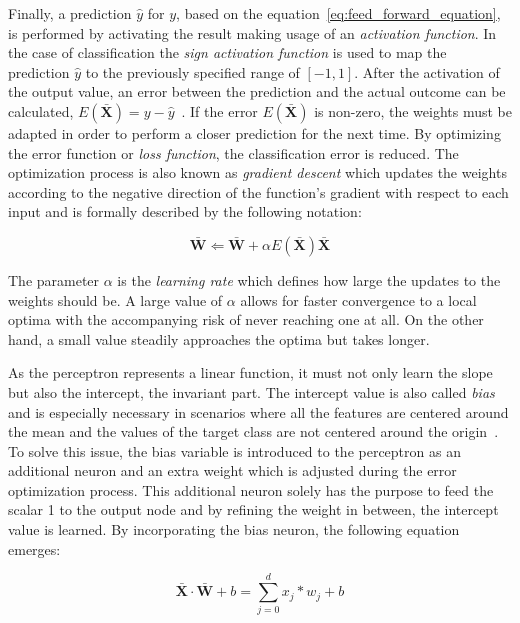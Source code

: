\documentclass[draft,final]{vutinfth} %
\begin{document}
    Finally, a prediction $\hat{y}$ for $y$, based on the equation~\eqref{eq:feed_forward_equation}, is performed by activating the result making usage of an \textit{activation function}.
    In the case of classification the \textit{sign activation function} is used to map the prediction $\hat{y}$ to the previously specified range of $[-1,1]$.
    After the activation of the output value, an error between the prediction and the actual outcome can be calculated, $E(\bar{\boldsymbol{X}}) = y - \hat{y}$~\citep{aggarwal_neural_2018}.
    If the error $E(\bar{\boldsymbol{X}})$ is non-zero, the weights must be adapted in order to perform a closer prediction for the next time.
    By optimizing the error function or \textit{loss function}, the classification error is reduced.
    The optimization process is also known as \textit{gradient descent} which updates the weights according to the negative direction of the function's gradient with respect to each input and is formally described by the following notation:

    \begin{equation}
        \bar{\boldsymbol{W}} \Leftarrow \bar{\boldsymbol{W}} + \alpha E(\bar{\boldsymbol{X}})\bar{\boldsymbol{X}}\label{eq:weight_adjusting}
    \end{equation}

    The parameter $\alpha$ is the \textit{learning rate} which defines how large the updates to the weights should be.
    A large value of $\alpha$ allows for faster convergence to a local optima with the accompanying risk of never reaching one at all.
    On the other hand, a small value steadily approaches the optima but takes longer.


    As the perceptron represents a linear function, it must not only learn the slope but also the intercept, the invariant part.
    The intercept value is also called \textit{bias} and is especially necessary in scenarios where all the features are centered around the mean and the values of the target class are not centered around the origin~\citep{aggarwal_neural_2018}.
    To solve this issue, the bias variable is introduced to the perceptron as an additional neuron and an extra weight which is adjusted during the error optimization process.
    This additional neuron solely has the purpose to feed the scalar 1 to the output node and by refining the weight in between, the intercept value is learned.
    By incorporating the bias neuron, the following equation emerges:

    \begin{equation}
        \bar{\boldsymbol{X}}\cdot\bar{\boldsymbol{W}} + b=\sum_{j=0}^{d}x_j*w_j + b\label{eq:linear_function_equation}
    \end{equation}
\end{document}
